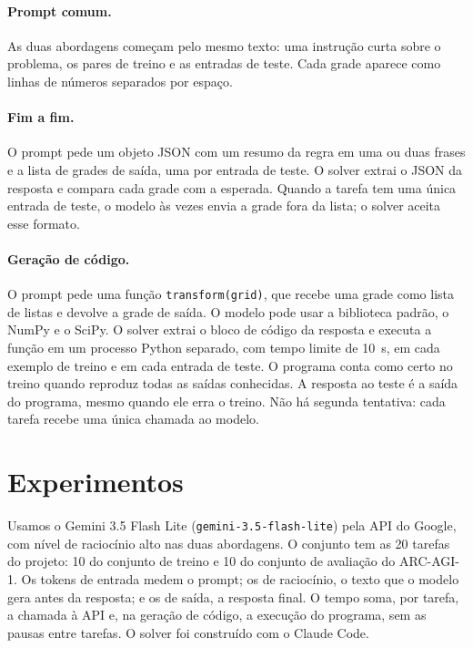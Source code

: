 \documentclass{article}
\begin{document}
\paragraph{Prompt comum.} As duas abordagens começam pelo mesmo texto: uma instrução curta
sobre o problema, os pares de treino e as entradas de teste. Cada grade aparece como linhas de
números separados por espaço.

\paragraph{Fim a fim.} O prompt pede um objeto JSON com um resumo da regra em uma ou duas
frases e a lista de grades de saída, uma por entrada de teste. O solver extrai o JSON da
resposta e compara cada grade com a esperada. Quando a tarefa tem uma única entrada de teste,
o modelo às vezes envia a grade fora da lista; o solver aceita esse formato.

\paragraph{Geração de código.} O prompt pede uma função \texttt{transform(grid)}, que recebe
uma grade como lista de listas e devolve a grade de saída. O modelo pode usar a biblioteca
padrão, o NumPy e o SciPy. O solver extrai o bloco de código da resposta e executa a função
em um processo Python separado, com tempo limite de 10~s, em cada exemplo de treino e em cada
entrada de teste. O programa conta como certo no treino quando reproduz todas as saídas
conhecidas. A resposta ao teste é a saída do programa, mesmo quando ele erra o treino. Não há
segunda tentativa: cada tarefa recebe uma única chamada ao modelo.

\section{Experimentos}

Usamos o Gemini 3.5 Flash Lite (\texttt{gemini-3.5-flash-lite}) pela API do Google, com nível
de raciocínio alto nas duas abordagens. O conjunto tem as 20 tarefas do projeto: 10 do
conjunto de treino e 10 do conjunto de avaliação do ARC-AGI-1. Os tokens de entrada medem o
prompt; os de raciocínio, o texto que o modelo gera antes da resposta; e os de saída, a
resposta final. O tempo soma, por tarefa, a chamada à API e, na geração de código, a execução
do programa, sem as pausas entre tarefas. O solver foi construído com o Claude Code.
\end{document}
